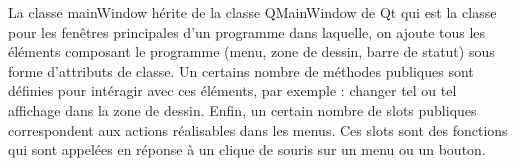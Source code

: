 La classe mainWindow h\'erite de la classe QMainWindow de Qt qui est la classe pour les fen\^etres principales d'un programme dans laquelle, on ajoute tous les \'el\'ements composant le programme (menu, zone de dessin, barre de statut) sous forme d'attributs de classe.
Un certains nombre de m\'ethodes publiques sont d\'efinies pour int\'eragir avec ces \'el\'ements, par exemple : changer tel ou tel affichage dans la zone de dessin.
Enfin, un certain nombre de slots publiques correspondent aux actions r\'ealisables dans les menus. Ces slots sont des fonctions qui sont appel\'ees en r\'eponse \`a un clique de souris sur un menu ou un bouton.